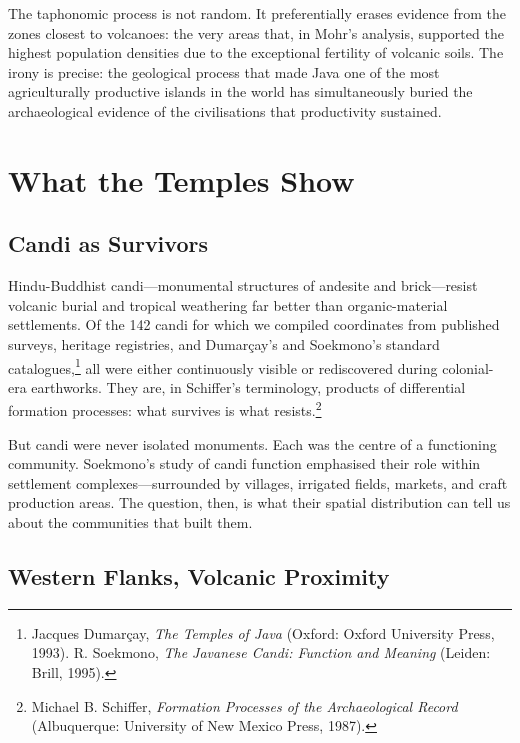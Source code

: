 \documentclass[12pt,a4paper]{article}
\begin{document}
The taphonomic process is not random. It preferentially erases evidence from the zones closest to volcanoes: the very areas that, in Mohr's analysis, supported the highest population densities due to the exceptional fertility of volcanic soils. The irony is precise: the geological process that made Java one of the most agriculturally productive islands in the world has simultaneously buried the archaeological evidence of the civilisations that productivity sustained.

\section{What the Temples Show}

\subsection{Candi as Survivors}

Hindu-Buddhist candi---monumental structures of andesite and brick---resist volcanic burial and tropical weathering far better than organic-material settlements. Of the 142 candi for which we compiled coordinates from published surveys, heritage registries, and Dumar\c{c}ay's and Soekmono's standard catalogues,\footnote{Jacques Dumar\c{c}ay, \emph{The Temples of Java} (Oxford: Oxford University Press, 1993). R. Soekmono, \emph{The Javanese Candi: Function and Meaning} (Leiden: Brill, 1995).} all were either continuously visible or rediscovered during colonial-era earthworks. They are, in Schiffer's terminology, products of differential formation processes: what survives is what resists.\footnote{Michael B. Schiffer, \emph{Formation Processes of the Archaeological Record} (Albuquerque: University of New Mexico Press, 1987).}

But candi were never isolated monuments. Each was the centre of a functioning community. Soekmono's study of candi function emphasised their role within settlement complexes---surrounded by villages, irrigated fields, markets, and craft production areas. The question, then, is what their spatial distribution can tell us about the communities that built them.

\subsection{Western Flanks, Volcanic Proximity}
\end{document}

